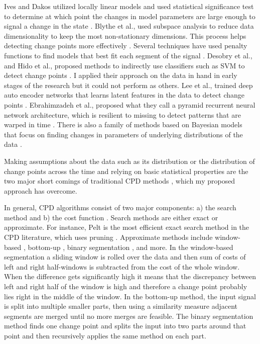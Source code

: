 Ives and Dakos utilized locally linear models and used statistical significance test to determine at which point the changes in model parameters are large enough to signal a change in the state \cite{Ives2012}. Blythe et al., used subspace analysis to reduce data dimensionality to keep the most non-stationary dimensions. This process helps detecting change points more effectively \cite{Blythe2012}.
Several techniques have used penalty functions to find models that best fit each segment of the signal \cite{Lavielle1999, lavielle2005using, keshavarz2018optimal, pein2017heterogeneous, khan2019deep}. 
Desobry et al., and Hido et al., proposed methods to indirectly use classifiers such as SVM to detect change points \cite{desobry2005online, hido2008unsupervised, Khan2019thesis}. I applied their approach on the data in hand in early stages of the research but it could not perform as others.
Lee et al., trained deep auto encoder networks that learns latent features in the data to detect change points \cite{Lee2018TimeSeriesSegmentation}. Ebrahimzadeh et al., proposed what they call a pyramid recurrent neural network architecture, which is resilient to missing to detect patterns that are warped in time \cite{Ebrahimzadeh2019}.
There is also a family of methods based on Bayesian models that focus on finding changes in parameters of underlying distributions of the data \cite{Lee2018TimeSeriesSegmentation, adams2007bayesian, bai1997estimation, barry1993bayesian, erdman2008fast, ray2002bayesian}. 

Making assumptions about the data such as its distribution or the distribution of change points across the time and relying on basic statistical properties are the two major short comings of traditional CPD methods \cite{Lee2018TimeSeriesSegmentation}, which my proposed approach has overcome.


In general, CPD algorithms consist of two major components: a) the search method and b) the cost function \cite{Truong2018ChangePointSurvey}.
Search methods are either exact or approximate. For instance, Pelt is the most efficient exact search method in the CPD literature, which uses pruning \cite{killick2012optimal}. Approximate methods include window-based \cite{basseville1993detection}, bottom-up \cite{keogh2001online}, binary segmentation \cite{scott1974cluster}, and more. In the window-based segmentation a sliding window is rolled over the data and then sum of costs of left and right half-windows is subtracted from the cost of the whole window. When the difference gets significantly high it means that the discrepancy between left and right half of the window is high and therefore a change point probably lies right in the middle of the window. In the bottom-up method, the input signal is split into multiple smaller parts, then using a similarity measure adjacent segments are merged until no more merges are feasible. The binary segmentation method finds one change point and splits the input into two parts around that point and then recursively applies the same method on each part.

